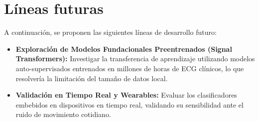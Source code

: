 \section{Líneas futuras}
\label{sec:lineas_futuras}

A continuación, se proponen las siguientes líneas de desarrollo futuro:
\begin{itemize}
  \item \textbf{Exploración de Modelos Fundacionales Preentrenados (Signal Transformers):}
  Investigar la transferencia de aprendizaje utilizando modelos auto-supervisados entrenados
  en millones de horas de ECG clínicos, lo que resolvería la limitación del tamaño de datos local.
  \item \textbf{Validación en Tiempo Real y Wearables:} Evaluar los clasificadores embebidos en
  dispositivos en tiempo real, validando su sensibilidad ante el ruido de movimiento cotidiano.
\end{itemize}

